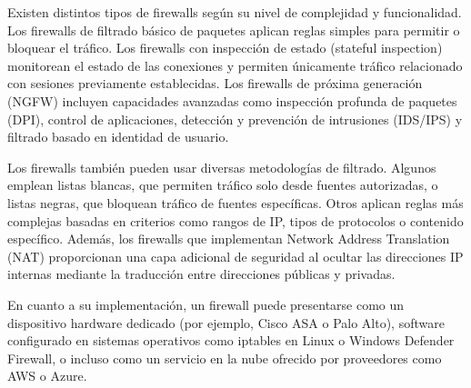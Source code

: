 Existen distintos tipos de firewalls según su nivel de complejidad y funcionalidad. Los firewalls de filtrado básico de paquetes aplican reglas simples para permitir o bloquear el tráfico. Los firewalls con inspección de estado (stateful inspection) monitorean el estado de las conexiones y permiten únicamente tráfico relacionado con sesiones previamente establecidas. Los firewalls de próxima generación (NGFW) incluyen capacidades avanzadas como inspección profunda de paquetes (DPI), control de aplicaciones, detección y prevención de intrusiones (IDS/IPS) y filtrado basado en identidad de usuario.

Los firewalls también pueden usar diversas metodologías de filtrado. Algunos emplean listas blancas, que permiten tráfico solo desde fuentes autorizadas, o listas negras, que bloquean tráfico de fuentes específicas. Otros aplican reglas más complejas basadas en criterios como rangos de IP, tipos de protocolos o contenido específico. Además, los firewalls que implementan Network Address Translation (NAT) proporcionan una capa adicional de seguridad al ocultar las direcciones IP internas mediante la traducción entre direcciones públicas y privadas.

En cuanto a su implementación, un firewall puede presentarse como un dispositivo hardware dedicado (por ejemplo, Cisco ASA o Palo Alto), software configurado en sistemas operativos como iptables en Linux o Windows Defender Firewall, o incluso como un servicio en la nube ofrecido por proveedores como AWS o Azure.
